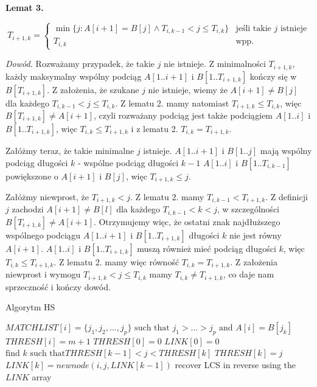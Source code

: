\documentclass[11pt]{article}
\begin{document}
\textbf{Lemat 3.}

$$T_{i+1,k} = \begin{cases}
    \min\{j\colon A[i+1] = B[j] \land T_{i, k-1} < j \le T_{i,k}\} & \text{jeśli takie $j$ istnieje} \\
    T_{i, k} & \text{wpp.} 
\end{cases}$$

\textit{Dowód.} Rozważamy przypadek, że takie $j$ nie istnieje. Z minimalności $T_{i+1,k}$, każdy maksymalny wspólny podciąg $A[1..i+1]$ i $B[1..T_{i+1,k}]$ kończy się w $B[T_{i+1,k}]$. Z założenia, że szukane $j$ nie istnieje, wiemy że $A[i + 1] \neq B[j]$ dla każdego $T_{i, k-1} < j \le T_{i,k}$. Z lematu 2. mamy natomiast $T_{i+1,k} \le T_{i,k}$, więc $B[T_{i+1,k}] \neq A[i+1]$, czyli rozważany podciąg jest także podciągiem $A[1..i]$ i $B[1..T_{i+1,k}]$, więc $T_{i,k} \le T_{i+1,k}$ i z lematu 2. $T_{i,k} = T_{i+1,k}$.

Załóżmy teraz, że takie minimalne $j$ istnieje. $A[1..i+1]$ i $B[1..j]$ mają wspólny podciąg długości $k$ - wspólne podciąg długości $k-1$ $A[1..i]$ i $B[1..T_{i,k-1}]$ powiększone o $A[i+1]$ i $B[j]$, więc $T_{i+1,k} \le j$. 

Załóżmy niewprost, że $T_{i+1,k} < j$. Z lematu 2. mamy $T_{i,k-1} < T_{i+1,k}$. Z definicji $j$ zachodzi $A[i+1] \neq B[l]$ dla każdego $T_{i,k-1} < k < j$, w szczególności $B[T_{i+1,k}] \neq A[i+1]$. Otrzymujemy więc, że ostatni znak najdłuższego wspólnego podciągu $A[1..i+1]$ i $B[1..T_{i+1,k}]$ długości $k$ nie jest równy $A[i+1]$. $A[1..i]$ i $B[1..T_{i+1,k}]$ muszą również mieć podciąg długości $k$, więc $T_{i,k} \le T_{i+1,k}$. Z lematu 2. mamy więc równość $T_{i, k} = T_{i+1,k}$. Z założenia niewprost i wymogu $T_{i+1,k} < j \le T_{i,k}$ mamy $T_{i,k} \neq T_{i+1,k}$, co daje nam sprzeczność i kończy dowód.

\begin{algorithm}
\caption{Algorytm HS}\label{alg:hs}
\begin{algorithmic}
    \State $MATCHLIST[i] = \{j_1, j_2, \dots, j_p\} \text{ such that $j_1 > \dots > j_p$ and $A[i] = B[j_k]$}$
    \State $THRESH[i] = m + 1$
\EndFor
\State $THRESH[0] = 0$
\State $LINK[0] = 0$
        \State $\text{find $k$ such that} THRESH[k-1] < j < THRESH[k]$
            \State $THRESH[k] = j$
            \State $LINK[k] = newnode(i, j, LINK[k-1])$
        \EndIf
    \EndFor
\EndFor
\State recover LCS in reverse using the $LINK$ array
\end{algorithmic}
\end{algorithm}
\end{document}
